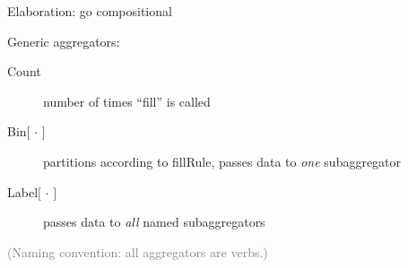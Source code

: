\documentclass[aspectratio=169]{beamer}
\begin{document}
\begin{frame}{Elaboration: go compositional}
\begin{center}
\begin{minipage}{0.8\linewidth}
\Large
Generic aggregators:
\vspace{0.25 cm}
\begin{description}
\item[Count] number of times ``fill'' is called
\item[Bin$\lbrack\,\cdot\,\rbrack$] partitions according to fillRule, passes data to {\it one} subaggregator
\item[Label$\lbrack\,\cdot\,\rbrack$] passes data to {\it all} named subaggregators
\end{description}

\vspace{0.75 cm}
\textcolor{gray}{\normalsize (Naming convention: all aggregators are verbs.)}
\end{minipage}
\end{center}
\end{frame}



\end{document}
